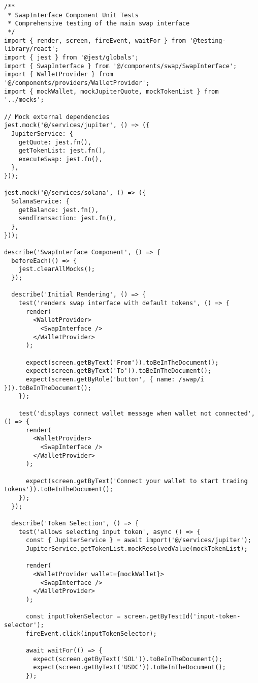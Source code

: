 \documentclass[11pt,a4paper]{article}
\begin{document}
\begin{lstlisting}[style=typescript, caption=React Component Unit Tests]
/**
 * SwapInterface Component Unit Tests
 * Comprehensive testing of the main swap interface
 */
import { render, screen, fireEvent, waitFor } from '@testing-library/react';
import { jest } from '@jest/globals';
import { SwapInterface } from '@/components/swap/SwapInterface';
import { WalletProvider } from '@/components/providers/WalletProvider';
import { mockWallet, mockJupiterQuote, mockTokenList } from '../mocks';

// Mock external dependencies
jest.mock('@/services/jupiter', () => ({
  JupiterService: {
    getQuote: jest.fn(),
    getTokenList: jest.fn(),
    executeSwap: jest.fn(),
  },
}));

jest.mock('@/services/solana', () => ({
  SolanaService: {
    getBalance: jest.fn(),
    sendTransaction: jest.fn(),
  },
}));

describe('SwapInterface Component', () => {
  beforeEach(() => {
    jest.clearAllMocks();
  });

  describe('Initial Rendering', () => {
    test('renders swap interface with default tokens', () => {
      render(
        <WalletProvider>
          <SwapInterface />
        </WalletProvider>
      );

      expect(screen.getByText('From')).toBeInTheDocument();
      expect(screen.getByText('To')).toBeInTheDocument();
      expect(screen.getByRole('button', { name: /swap/i })).toBeInTheDocument();
    });

    test('displays connect wallet message when wallet not connected', () => {
      render(
        <WalletProvider>
          <SwapInterface />
        </WalletProvider>
      );

      expect(screen.getByText('Connect your wallet to start trading tokens')).toBeInTheDocument();
    });
  });

  describe('Token Selection', () => {
    test('allows selecting input token', async () => {
      const { JupiterService } = await import('@/services/jupiter');
      JupiterService.getTokenList.mockResolvedValue(mockTokenList);

      render(
        <WalletProvider wallet={mockWallet}>
          <SwapInterface />
        </WalletProvider>
      );

      const inputTokenSelector = screen.getByTestId('input-token-selector');
      fireEvent.click(inputTokenSelector);

      await waitFor(() => {
        expect(screen.getByText('SOL')).toBeInTheDocument();
        expect(screen.getByText('USDC')).toBeInTheDocument();
      });


\end{lstlisting}
\end{document}
